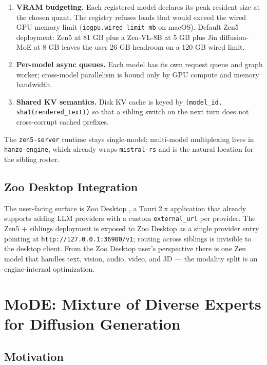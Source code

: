 \documentclass[11pt,a4paper]{article}
\begin{document}
\begin{enumerate}
  \item \textbf{VRAM budgeting.} Each registered model declares its peak resident size at the
        chosen quant. The registry refuses loads that would exceed the wired GPU memory limit
        (\texttt{iogpu.wired\_limit\_mb} on macOS). Default Zen5 deployment: Zen5 at 81 GB plus a
        Zen-VL-8B at 5 GB plus Jin diffusion-MoE at 8 GB leaves the user 26 GB headroom on a 120 GB
        wired limit.
  \item \textbf{Per-model async queues.} Each model has its own request queue and graph worker;
        cross-model parallelism is bound only by GPU compute and memory bandwidth.
  \item \textbf{Shared KV semantics.} Disk KV cache is keyed by \texttt{(model\_id, sha1(rendered\_text))}
        so that a sibling switch on the next turn does not cross-corrupt cached prefixes.
\end{enumerate}

The \texttt{zen5-server} runtime stays single-model; multi-model multiplexing lives in
\texttt{hanzo-engine}, which already wraps \texttt{mistral-rs} and is the natural location for the
sibling roster.

\subsection{Zoo Desktop Integration}

The user-facing surface is Zoo Desktop \cite{zoodesktop}, a Tauri 2.x application that already
supports adding LLM providers with a custom \texttt{external\_url} per provider. The Zen5 + siblings
deployment is exposed to Zoo Desktop as a single provider entry pointing at
\texttt{http://127.0.0.1:36900/v1}; routing across siblings is invisible to the desktop client. From
the Zoo Desktop user's perspective there is one Zen model that handles text, vision, audio, video,
and 3D --- the modality split is an engine-internal optimization.

\section{MoDE: Mixture of Diverse Experts for Diffusion Generation}
\label{sec:mode}

\subsection{Motivation}
\end{document}
